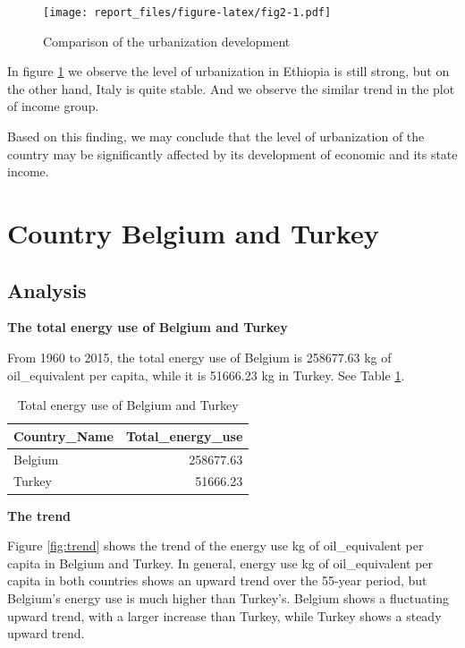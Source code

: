 \documentclass[11pt,a4paper,]{article}
\begin{document}
\begin{figure}
\centering
\texttt{[image: report\_files/figure-latex/fig2-1.pdf]}
\caption{\label{fig:fig2}Comparison of the urbanization development}
\end{figure}

In figure \ref{fig:fig2} we observe the level of urbanization in Ethiopia is still strong, but on the other hand, Italy is quite stable. And we observe the similar trend in the plot of income group.

Based on this finding, we may conclude that the level of urbanization of the country may be significantly affected by its development of economic and its state income.

\clearpage

\section*{Country Belgium and Turkey}

\subsection*{Analysis}

\textbf{The total energy use of Belgium and Turkey}

From 1960 to 2015, the total energy use of Belgium is 258677.63 kg of oil\_equivalent per capita, while it is 51666.23 kg in Turkey. See Table \ref{tab:energyuse-Tot}.

\begin{table}

\caption{\label{tab:energyuse-Tot}Total energy use of Belgium and Turkey}
\centering
\begin{tabular}[t]{l|r}
\hline
Country\_Name & Total\_energy\_use\\
\hline
Belgium & 258677.63\\
\hline
Turkey & 51666.23\\
\hline
\end{tabular}
\end{table}

\textbf{The trend}

Figure \ref{fig:trend} shows the trend of the energy use kg of oil\_equivalent per capita in Belgium and Turkey. In general, energy use kg of oil\_equivalent per capita in both countries shows an upward trend over the 55-year period, but Belgium's energy use is much higher than Turkey's. Belgium shows a fluctuating upward trend, with a larger increase than Turkey, while Turkey shows a steady upward trend.
\end{document}
